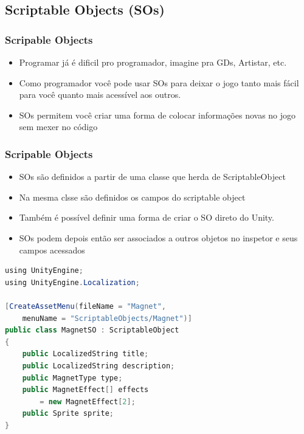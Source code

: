 \documentclass{beamer}
\begin{document}
	\subsection{Scriptable Objects (SOs)}
	\begin{frame}
		\frametitle{Scripable Objects}

		\begin{itemize}
			\item Programar já é dificil pro programador, imagine pra GDs,
				Artistar, etc.

			\item Como programador você pode usar SOs para deixar o jogo tanto
				mais fácil para você quanto mais acessível aos outros.

			\item SOs permitem você criar uma forma de colocar informações
				novas no jogo sem mexer no código

		\end{itemize}
	\end{frame}

	\begin{frame}
		\frametitle{Scripable Objects}

		\begin{itemize}
			\item SOs são definidos a partir de uma classe que herda de
				ScriptableObject

			\item Na mesma clsse são definidos os campos do scriptable object

			\item Também é possível definir uma forma de criar o SO direto do
				Unity.

			\item SOs podem depois então ser associados a outros objetos no
				inspetor e seus campos acessados

		\end{itemize}
	\end{frame}

	\begin{frame}[fragile]
		\begin{lstlisting}[language=Java,basicstyle=\ttfamily,keywordstyle=\color{blue}]
using UnityEngine;
using UnityEngine.Localization;

[CreateAssetMenu(fileName = "Magnet",
	menuName = "ScriptableObjects/Magnet")]
public class MagnetSO : ScriptableObject
{
	public LocalizedString title;
	public LocalizedString description;
	public MagnetType type;
	public MagnetEffect[] effects
		= new MagnetEffect[2];
	public Sprite sprite;
}
		\end{lstlisting}
	\end{frame}
\end{document}
